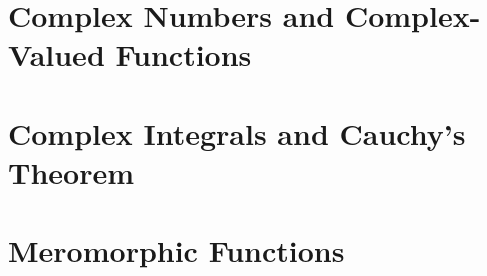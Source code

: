 \documentclass{report}
\begin{document}
	
	\thispagestyle{empty}
	\newpage%
	\tableofcontents
  
  \chapter{Complex Numbers and Complex-Valued Functions}
  
  \chapter{Complex Integrals and Cauchy's Theorem}
  
  \chapter{Meromorphic Functions}
  
  
\end{document}
